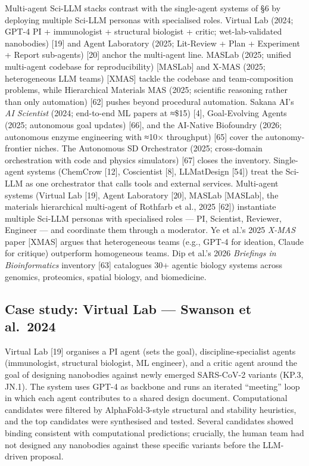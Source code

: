 Multi-agent Sci-LLM stacks contrast with the single-agent systems of §6 by deploying multiple Sci-LLM personas with specialised roles. Virtual Lab (2024; GPT-4 PI + immunologist + structural biologist + critic; wet-lab-validated nanobodies) {[}19{]} and Agent Laboratory (2025; Lit-Review + Plan + Experiment + Report sub-agents) {[}20{]} anchor the multi-agent line. MASLab (2025; unified multi-agent codebase for reproducibility) {[}MASLab{]} and X-MAS (2025; heterogeneous LLM teams) {[}XMAS{]} tackle the codebase and team-composition problems, while Hierarchical Materials MAS (2025; scientific reasoning rather than only automation) {[}62{]} pushes beyond procedural automation. Sakana AI's \emph{AI Scientist} (2024; end-to-end ML papers at ≈\$15) {[}4{]}, Goal-Evolving Agents (2025; autonomous goal updates) {[}66{]}, and the AI-Native Biofoundry (2026; autonomous enzyme engineering with ≈10× throughput) {[}65{]} cover the autonomy-frontier niches. The Autonomous SD Orchestrator (2025; cross-domain orchestration with code and physics simulators) {[}67{]} closes the inventory. Single-agent systems (ChemCrow {[}12{]}, Coscientist {[}8{]}, LLMatDesign {[}54{]}) treat the Sci-LLM as one orchestrator that calls tools and external services. Multi-agent systems (Virtual Lab {[}19{]}, Agent Laboratory {[}20{]}, MASLab {[}MASLab{]}, the materials hierarchical multi-agent of Rothfarb et al., 2025 {[}62{]}) instantiate multiple Sci-LLM personas with specialised roles --- PI, Scientist, Reviewer, Engineer --- and coordinate them through a moderator. Ye et al.'s 2025 \emph{X-MAS} paper {[}XMAS{]} argues that heterogeneous teams (e.g., GPT-4 for ideation, Claude for critique) outperform homogeneous teams. Dip et al.'s 2026 \emph{Briefings in Bioinformatics} inventory {[}63{]} catalogues 30+ agentic biology systems across genomics, proteomics, spatial biology, and biomedicine.

\subsection{Case study: Virtual Lab --- Swanson et al.~2024}\label{case-study-virtual-lab-swanson-et-al.-2024}

Virtual Lab {[}19{]} organises a PI agent (sets the goal), discipline-specialist agents (immunologist, structural biologist, ML engineer), and a critic agent around the goal of designing nanobodies against newly emerged SARS-CoV-2 variants (KP.3, JN.1). The system uses GPT-4 as backbone and runs an iterated ``meeting'' loop in which each agent contributes to a shared design document. Computational candidates were filtered by AlphaFold-3-style structural and stability heuristics, and the top candidates were synthesised and tested. Several candidates showed binding consistent with computational predictions; crucially, the human team had not designed any nanobodies against these specific variants before the LLM-driven proposal.

